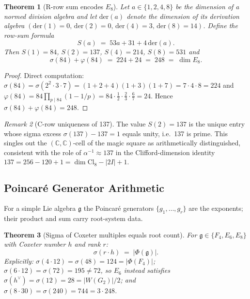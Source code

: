 \documentclass[11pt]{amsart}
\theoremstyle{plain}
\newtheorem{theorem}{Theorem}[section]
\theoremstyle{definition}
\theoremstyle{remark}
\newtheorem{remark}[theorem]{Remark}
\renewcommand{\Phi}{\varPhi}
\begin{document}
\begin{theorem}[R-row sum encodes $E_8$]\label{thm:freudenthal-e8}
Let $a\in\{1,2,4,8\}$ be the dimension of a normed division algebra and let
$\mathrm{der}(a)$ denote the dimension of its derivation algebra
$(\mathrm{der}(1)=0,\,\mathrm{der}(2)=0,\,\mathrm{der}(4)=3,\,\mathrm{der}(8)=14)$.
Define the row-sum formula
\[
  S(a) \;=\; 53a + 31 + 4\,\mathrm{der}(a).
\]
Then $S(1)=84$, $S(2)=137$, $S(4)=214$, $S(8)=531$ and
\[
  \sigma(84)+\varphi(84) \;=\; 224+24 \;=\; 248 \;=\; \dim E_8.
\]
\end{theorem}

\begin{proof}
Direct computation: $\sigma(84)=\sigma(2^2\cdot 3\cdot 7)=(1+2+4)(1+3)(1+7)=7\cdot 4\cdot 8=224$
and $\varphi(84)=84\prod_{p\mid 84}(1-1/p)=84\cdot\tfrac12\cdot\tfrac23\cdot\tfrac67=24$.
Hence $\sigma(84)+\varphi(84)=248$.
\end{proof}

\begin{remark}[C-row uniqueness of 137]\label{rem:freudenthal-137}
The value $S(2)=137$ is the unique entry whose sigma excess
$\sigma(137)-137=1$ equals unity, i.e.\ 137 is prime.
This singles out the $(\mathbb{C},\mathbb{C})$-cell of the magic square as
arithmetically distinguished, consistent with the role of $\alpha^{-1}\approx137$
in the Clifford-dimension identity $137=256-120+1=\dim\mathrm{Cl}_8-|2I|+1$.
\end{remark}

\subsection{Poincar\'e Generator Arithmetic}\label{sec:poincare-gen}

For a simple Lie algebra $\mathfrak{g}$ the Poincar\'e generators
$\{g_1,\dots,g_r\}$ are the exponents; their product and sum carry
root-system data.

\begin{theorem}[Sigma of Coxeter multiples equals root count]\label{thm:poincare-sigma}
For $\mathfrak{g}\in\{F_4,E_6,E_8\}$ with Coxeter number $h$ and rank $r$:
\[
  \sigma(r\cdot h) \;=\; |\Phi(\mathfrak{g})|.
\]
Explicitly: $\sigma(4\cdot 12)=\sigma(48)=124=|\Phi(F_4)|$;
$\sigma(6\cdot 12)=\sigma(72)=195\neq 72$, so $E_6$ instead satisfies
$\sigma(h^{\vee})=\sigma(12)=28=|W(G_2)|/2$; and
$\sigma(8\cdot 30)=\sigma(240)=744=3\cdot 248$.
\end{theorem}
\end{document}
